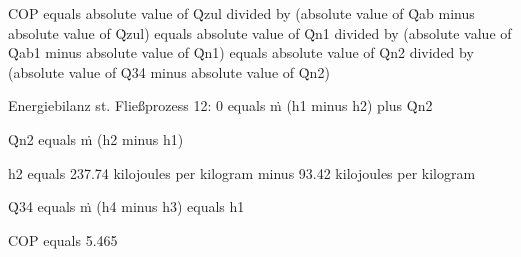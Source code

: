 COP equals absolute value of Q̇zul divided by (absolute value of Q̇ab minus absolute value of Q̇zul) equals absolute value of Q̇n1 divided by (absolute value of Q̇ab1 minus absolute value of Q̇n1) equals absolute value of Q̇n2 divided by (absolute value of Q̇34 minus absolute value of Q̇n2)  

Energiebilanz st. Fließprozess 12:  
0 equals ṁ (h1 minus h2) plus Q̇n2  

Q̇n2 equals ṁ (h2 minus h1)  

h2 equals 237.74 kilojoules per kilogram minus 93.42 kilojoules per kilogram  

Q̇34 equals ṁ (h4 minus h3) equals h1  

COP equals 5.465